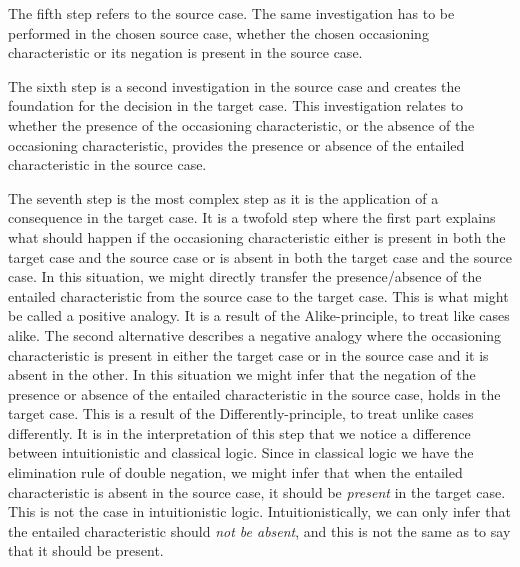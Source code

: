 		The fifth step refers to the source case. The same investigation has to be performed in the chosen source case, whether the chosen occasioning characteristic or its negation is present in the source case. 
		
		The sixth step is a second investigation in the source case and creates the foundation for the decision in the target case. This investigation relates to whether the presence of the occasioning characteristic, or the absence of the occasioning characteristic, provides the presence or absence of the entailed characteristic in the source case. 
		
		The seventh step is the most complex step as it is the application of a consequence in the target case. It is a twofold step where the first part explains what should happen if the occasioning characteristic either is present in both the target case and the source case or is absent in both the target case and the source case. In this situation, we might directly transfer the presence/absence of the entailed characteristic from the source case to the target case. This is what might be called a positive analogy. It is a result of the Alike-principle, to treat like cases alike. The second alternative describes a negative analogy where the occasioning characteristic is present in either the target case or in the source case and it is absent in the other. In this situation we might infer that the negation of the presence or absence of the entailed characteristic in the source case, holds in the target case. This is a result of the Differently-principle, to treat unlike cases differently. It is in the interpretation of this step that we notice a difference between intuitionistic and classical logic. Since in classical logic we have the elimination rule of double negation, we might infer that when the entailed characteristic is absent in the source case, it should be \textit{present} in the target case. This is not the case in intuitionistic logic. Intuitionistically, we can only infer that the entailed characteristic should \textit{not be absent}, and this is not the same as to say that it should be present. 
		
